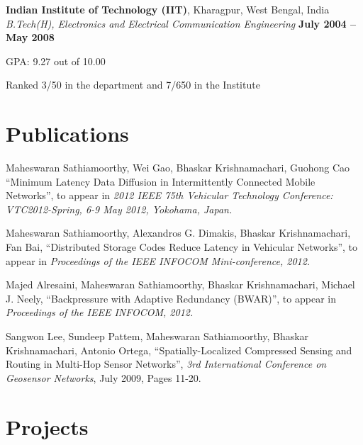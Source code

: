 \documentclass[margin,line]{resume}
\begin{document}
\begin{resume}
    
    \textbf{Indian Institute of Technology (IIT)}, Kharagpur, West Bengal, India \\%
    \textsl{B.Tech(H), Electronics and Electrical Communication Engineering} \hfill \textbf{ July 2004 -- May 2008}\vspace{-3mm}\\\vspace{-1mm}%
    \begin{list2}
    		\item GPA:	9.27 out of 10.00
    		\item Ranked 3/50 in the department and 7/650 in the Institute        
    \end{list2}\vspace{-1.5mm}%


\section{\mysidestyle Publications}
\begin{list2}
    \item Maheswaran Sathiamoorthy, Wei Gao, Bhaskar Krishnamachari, Guohong Cao
    ``Minimum Latency Data Diffusion in Intermittently Connected Mobile Networks'', 
    to appear in \textsl{2012 IEEE 75th Vehicular Technology Conference: VTC2012-Spring, 6-9 May 2012, Yokohama, Japan.}
    \item Maheswaran Sathiamoorthy, Alexandros G. Dimakis, Bhaskar Krishnamachari, Fan Bai, 
    ``Distributed Storage Codes Reduce Latency in Vehicular Networks'', 
    to appear in \textsl{Proceedings of the IEEE INFOCOM Mini-conference, 2012.}
    \item Majed Alresaini, Maheswaran Sathiamoorthy, Bhaskar Krishnamachari, Michael J. Neely, ``Backpressure with Adaptive Redundancy (BWAR)'', 
    to appear in \textsl{Proceedings of the IEEE INFOCOM, 2012.}
    \item Sangwon Lee, Sundeep Pattem, Maheswaran Sathiamoorthy, Bhaskar Krishnamachari, Antonio Ortega, ``Spatially-Localized Compressed Sensing and Routing in Multi-Hop Sensor Networks'', \textsl{3rd International Conference on Geosensor Networks}, July 2009, Pages 11-20.  
    \end{list2}

\section{\mysidestyle Projects}


\end{resume}
\end{document}
